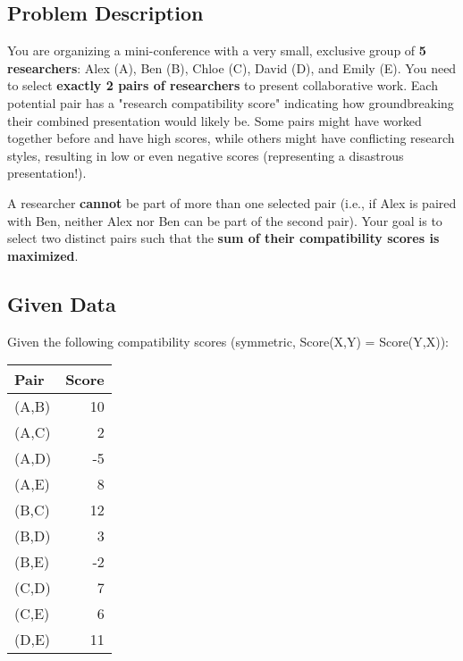 \documentclass[12pt]{article}
\begin{document}
\subsection*{Problem Description}

You are organizing a mini-conference with a very small, exclusive group of \textbf{5 researchers}: Alex (A), Ben (B), Chloe (C), David (D), and Emily (E). You need to select \textbf{exactly 2 pairs of researchers} to present collaborative work. Each potential pair has a "research compatibility score" indicating how groundbreaking their combined presentation would likely be. Some pairs might have worked together before and have high scores, while others might have conflicting research styles, resulting in low or even negative scores (representing a disastrous presentation!).

A researcher \textbf{cannot} be part of more than one selected pair (i.e., if Alex is paired with Ben, neither Alex nor Ben can be part of the second pair). Your goal is to select two distinct pairs such that the \textbf{sum of their compatibility scores is maximized}.

\subsection*{Given Data}
{Given the following compatibility scores (symmetric, Score(X,Y) = Score(Y,X)):}

\bigskip %

\begin{center}
    \begin{tabular}{l r}
        \toprule
        \textbf{Pair} & \textbf{Score} \\
        \midrule
        (A,B) & 10    \\
        (A,C) & 2     \\
        (A,D) & -5    \\
        (A,E) & 8     \\
        (B,C) & 12    \\
        (B,D) & 3     \\
        (B,E) & -2    \\
        (C,D) & 7     \\
        (C,E) & 6     \\
        (D,E) & 11    \\
        \bottomrule
    \end{tabular}
\end{center}
\end{document}
